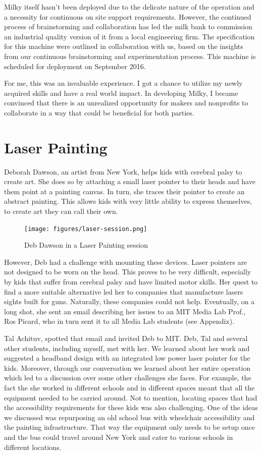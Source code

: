Milky itself hasn't been deployed due to the delicate nature of the operation and a necessity for continuous on site support requirements. However, the continued process of brainstorming and collaboration has led the milk bank to commission an industrial quality version of it from a local engineering firm. The specification for this machine were outlined in collaboration with us, based on the insights from our continuous brainstorming and experimentation process. This machine is scheduled for deployment on September 2016.

For me, this was an invaluable experience. I got a chance to utilize my newly acquired skills and have a real world impact.  In developing Milky, I became convinced that there is an unrealized opportunity for makers and nonprofits to collaborate in a way that could be beneficial for both parties.

\section{Laser Painting}

Deborah Dawson, an artist from New York, helps kids with cerebral palsy to create art. She does so by attaching a small laser pointer to their heads and have them point at a painting canvas. In turn, she traces their pointer to create an abstract painting. This allows kids with very little ability to express themselves, to create art they can call their own.

   \begin{figure}[thpb]
      \centering
      \texttt{[image: figures/laser-session.png]}
      \caption{Deb Dawson in a Laser Painting session}
      \label{laser-session}
   \end{figure}

However, Deb had a challenge with mounting these devices. Laser pointers are not designed to be worn on the head. This proves to be very difficult, especially by kids that suffer from cerebral palsy and have limited motor skills. Her quest to find a more suitable alternative led her to companies that manufacture lasers sights built for guns. Naturally, these companies could not help. Eventually, on a long shot, she sent an email describing her issues to an MIT Media Lab Prof., Ros Picard, who in turn sent it to all Media Lab students (see Appendix). 

Tal Achituv, spotted that email and invited Deb to MIT. Deb, Tal and several other students, including myself, met with her. We learned about her work and suggested a headband design with an integrated low power laser pointer for the kids. Moreover, through our conversation we learned about her entire operation which led to a discussion over some other challenges she faces. For example, the fact the she worked in different schools and in different spaces meant that all the equipment needed to be carried around. Not to mention, locating spaces that had the accessibility requirements for these kids was also challenging. One of the ideas we discussed was repurposing an old school bus with wheelchair accessibility and the painting infrastructure. That way the equipment only needs to be setup once and the bus could travel around New York and cater to various schools in different locations. 

